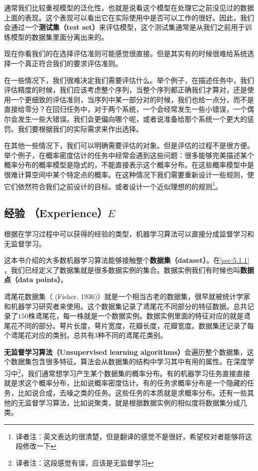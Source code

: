 通常我们比较重视模型的泛化性，也就是说看这个模型在处理它之前没见过的数据上面的表现。这个表现可以看出它在实际使用中是否可以工作的很好。因此，我们会通过一个\textbf{测试集（test set）}来评估模型，这个测试集通常是从我们之前用于训练模型的数据集里面分离出来的。

现在你看我们的在选择评估准则可能感觉很直接。但是其实有的时候很难给系统选择一个真正符合我们的要求评估准则。

在一些情况下，我们很难决定我们需要评估什么。举个例子，在描述任务中，我们评估精度的时候，我们应该考虑整个序列，当整个序列都正确我们才算对，还是使用一个更细致的评估准则，当序列中某一部分对的时候，我们也给一点分，而不是直接给零分？在回归任务中，对于两个系统，一个会经常发生一些小错误，一个偶尔会发生一些大错误。我们会更偏向哪个呢，或者说准备给那个系统一个更大的惩罚。我们要根据我们的实际需求来作出选择。

在其他一些情况下，我们可以明确需要评估的对象。但是评估的过程不是很方便。举个例子，在概率密度估计的任务中经常会遇到这些问题：很多能够完美描述某个概率分布的概率模型是隐式的，不能直接表示这个概率分布。在这些概率模型中是很难计算空间中某个特定点的概率。在这种情况下我们需要重新设计一些规则，使它们依然符合我们之前设计的目标。或者设计一个近似理想的的规则\footnote{译者注：英文表达的很清楚，但是翻译的感觉不是很好，希望校对者能够将这段修改一下}。



\subsection{经验 （Experience）$E$}
根据在学习过程中可以获得的经验的类型，机器学习算法可以直接分成监督学习和无监督学习。

这本书介绍的大多数机器学习算法能够接触整个\textbf{数据集（dataset）}。在\ref{sec:5.1.1} ，我们已经定义了数据集就是很多数据实例的集合。数据实例我们有时候也叫\textbf{数据点（data points）}。

鸢尾花数据集（ (Fisher, 1936)）就是一个相当古老的数据集，很早就被统计学家和机器学习研究者来使用。这个数据集记录了鸢尾花不同部分的特征数据。总共记录了$150$株鸢尾花，每一株就是一个数据实例。数据实例里面的特征对应的就是鸢尾花不同的部分。萼片长度，萼片宽度，花瓣长度，花瓣宽度。数据集还记录了每个鸢尾花对应的类别。总共有3种不同的鸢尾花类别。

\textbf{无监督学习算法（Unsupervised learning algorithms）}会遍历整个数据集，这个数据集包含很多特征。算法会从数据集的结构中学习其中有用的属性。在深度学习中\footnote{译者注：这段感觉有误，应该是无监督学习}，我们通常想学习产生某个数据集的概率分布。有的机器学习任务直接直接就是求这个概率分布，比如说概率密度估计。有的任务求概率分布是一个隐藏的任务，比如说合成，去噪之类的任务。这些任务的本质就是求概率分布。还有一些其他的无监督学习算法，比如说聚类，就是根据数据实例的相似度将数据集分成几类。

